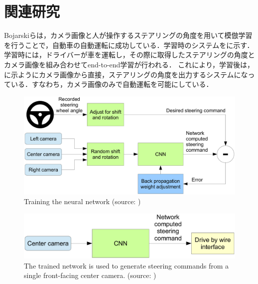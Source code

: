 
\section{関連研究}
     Bojarskiら\cite{bojarski}は，カメラ画像と人が操作するステアリングの角度を用いて模倣学習を行うことで，自動車の自動運転に成功している．学習時のシステムをに示す．学習時には，ドライバーが車を運転し，その際に取得したステアリングの角度とカメラ画像を組み合わせてend-to-end学習が行われる．
     これにより，学習後は，に示ようにカメラ画像から直接，ステアリングの角度を出力するシステムになっている．すなわち，カメラ画像のみで自動運転を可能にしている．
     
     \begin{figure}[h]
          \centering
          \includegraphics[keepaspectratio, scale=0.16] {images/eps/bojarski_train}
          \caption[Training the neural network]{Training the neural network (source: \cite{bojarski})}
          \label{Fig:bojarski_train}
     \end{figure}



     \begin{figure}[h]
          \centering
          \includegraphics[keepaspectratio, scale=0.20] {images/eps/bojarski_test.eps}
          \captionsetup{justification=raggedright} %
          \caption[The trained network is used to generate steering commands from a single front-facing center camera.]{The trained network is used to generate steering commands from a single front-facing center camera. (source: \cite{bojarski})}
          \label{Fig:bojarski_test}
     \end{figure}

